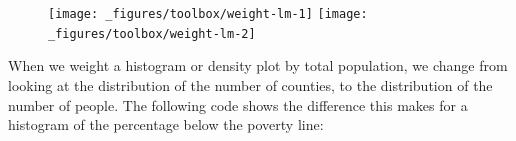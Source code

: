 \begin{Shaded}
\begin{Highlighting}[]
\StringTok{ }
\StringTok{  }\NormalTok{() +}\StringTok{ }
\StringTok{  }\NormalTok{(}  \NormalTok{)}

\StringTok{ }
\StringTok{  }\NormalTok{(}\NormalTok{(} \StringTok{ }\NormalTok{)) +}\StringTok{ }
\StringTok{  }\NormalTok{(}\NormalTok{(}   \NormalTok{) +}
\StringTok{  }\NormalTok{(} \NormalTok{)}
\end{Highlighting}
\end{Shaded}

\begin{figure}[H]
  \texttt{[image: \_figures/toolbox/weight-lm-1]}%
  \texttt{[image: \_figures/toolbox/weight-lm-2]}
\end{figure}

When we weight a histogram or density plot by total population, we
change from looking at the distribution of the number of counties, to
the distribution of the number of people. The following code shows the
difference this makes for a histogram of the percentage below the
poverty line: 

\begin{Shaded}
\begin{Highlighting}[]
\StringTok{  }\NormalTok{(} \NormalTok{) +}\StringTok{ }
\StringTok{  }\NormalTok{(}\NormalTok{)}

\StringTok{  }\NormalTok{(}\NormalTok{(}  \NormalTok{) +}
\StringTok{  }\NormalTok{(}\NormalTok{)}
\end{Highlighting}
\end{Shaded}

